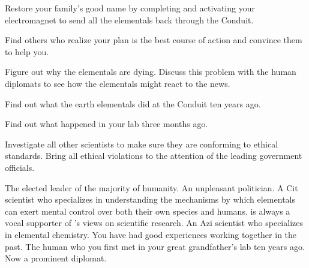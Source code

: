 \documentclass[char]{elementals}
\begin{document}

\begin{itemz}[Goals]
  \item Restore your family's good name by completing and activating your electromagnet to send all the elementals back through the Conduit.
  \item Find others who realize your plan is the best course of action and convince them to help you. %
  \item Figure out why the elementals are dying. Discuss this problem with the human diplomats to see how the elementals might react to the news.
  \item Find out what the earth elementals did at the Conduit ten years ago.
  \item Find out what happened in your lab three months ago.
  \item Investigate all other scientists to make sure they are conforming to ethical standards. Bring all ethical violations to the attention of the leading government officials.
\end{itemz}

\begin{contacts}
  \contact{\cLeader{}} The elected leader of the majority of humanity.
	\contact{\cDema{}} An unpleasant politician.
	\contact{\cMS{}} A Cit scientist who specializes in understanding the mechanisms by which elementals can exert mental control over both their own species and humans. \cMS{\They} is always a vocal supporter of \cDema{}'s views on scientific research.
	\contact{\cScientist{}} An Azi scientist who specializes in elemental chemistry. You have had good experiences working together in the past.
  \contact{\cAvatar{}} The human who you first met in your great grandfather's lab ten years ago. Now a prominent diplomat.
\end{contacts}
\end{document}
